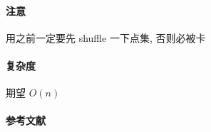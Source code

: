 \paragraph{注意} 用之前一定要先 shuffle 一下点集, 否则必被卡

\paragraph{复杂度} 期望 \(O(n)\)

\paragraph{参考文献} \cite{welzl2005smallest}

